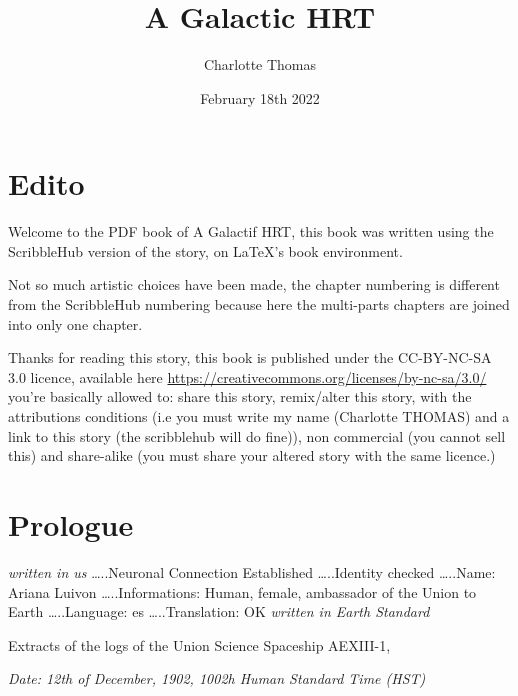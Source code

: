 \documentclass[hidelinks,12pt,a4paper]{book}
\title{A Galactic HRT}
\author{Charlotte Thomas}
\date{February 18th 2022}
\begin{document}
    \maketitle
    \tableofcontents
    
    \chapter*{Edito}
    Welcome to the PDF book of A Galactif HRT, this book was written using the ScribbleHub version of the story, on \LaTeX's book 
    environment.\par 
    \bigskip
    Not so much artistic choices have been made, the chapter numbering is different from the ScribbleHub numbering 
    because here the multi-parts chapters are joined into only one chapter.
    \par
    \bigskip 
    Thanks for reading this story, this book is published under the CC-BY-NC-SA 3.0 licence, available here 
    \url{https://creativecommons.org/licenses/by-nc-sa/3.0/}
    you're basically allowed to: share this story, remix/alter this story, with the attributions conditions (i.e you must 
    write my name (Charlotte THOMAS) and a link to this story (the scribblehub will do fine)), non commercial (you cannot 
    sell this) and share-alike (you must share your altered story with the same licence.)



    \chapter*{Prologue}
    \textit{written in \gls{us}}\newline
    …..Neuronal Connection Established\newline
    …..Identity checked\newline
    …..Name: Ariana Luivon\newline
    …..Informations: Human, female, ambassador of the Union to Earth\newline
    …..Language: \gls{es}\newline
    …..Translation: OK\newline
    \textit{written in Earth Standard}\newline

Extracts of the logs of the Union Science Spaceship AEXIII-1,\par
\textit{Date: 12th of December, 1902, 1002h Human Standard Time (HST)}\newline
\end{document}
